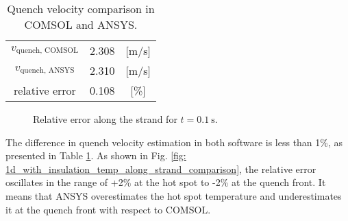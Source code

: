 \begin{table}[H]
    \caption{Quench velocity comparison in COMSOL and ANSYS.} 
    \vspace{-1.em} 
    \fontsize{10}{10}
    \selectfont 
    \renewcommand{\arraystretch}{1.5}
    \begin{center}
        \begin{tabular}{ ccc }  
        \hline
        $v_\text{quench, COMSOL}$ & 2.308 & [m/s] \\
        $v_\text{quench, ANSYS}$ & 2.310 & [m/s] \\
        relative error & 0.108 & [\%] \\
        \hline 
        \end{tabular}
    \end{center}  
     \label{table: 1d_with_insulation_v_quench_comparison} 
 \end{table}

\begin{figure}[H]
\centering
    \caption{Relative error along the strand for $t=0.1~\text{s}$.}
    \label{fig: ans_comsol_comparison_f_2_2_with_insulation}
\end{figure}

The difference in quench velocity estimation in both software is less than 1\%, as presented in Table \ref{table: 1d_with_insulation_v_quench_comparison}. As shown in Fig. \ref{fig: 1d_with_insulation_temp_along_strand_comparison}, the relative error oscillates in the range of +2\% at the hot spot to -2\% at the quench front. It means that ANSYS overestimates the hot spot temperature and underestimates it at the quench front with respect to COMSOL.

